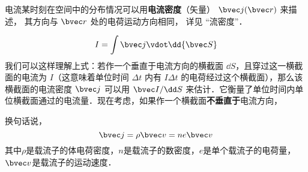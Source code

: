 

电流某时刻在空间中的分布情况可以用\textbf{电流密度}（矢量） $\bvec j(\bvec r)$ 来描述， 其方向与 $\bvec r$ 处的电荷运动方向相同， 详见 “流密度”．

\begin{equation}
I = \int \bvec j \vdot \dd{\bvec S}
\end{equation}
我们可以这样理解上式：若作一个垂直于电流方向的横截面 $\dd S$，且穿过这一横截面的电流为 $I$（这意味着单位时间 $\Delta t$ 内有 $I\Delta t$ 的电荷经过这个横截面），那么该横截面的电流密度 $\bvec j$ 可以用 $\bvec I/\dd S$ 来估计．它衡量了单位时间内单位横截面通过的电流量．现在考虑，如果作一个横截面\textbf{不垂直于}电流方向，

换句话说，
\begin{equation}
\bvec j = \rho \bvec v = ne \bvec v
\end{equation}
其中$\rho$是载流子的体电荷密度，$n$是载流子的数密度，$e$是单个载流子的电荷量，$\bvec v$是载流子的运动速度\cite{GriffE}．

